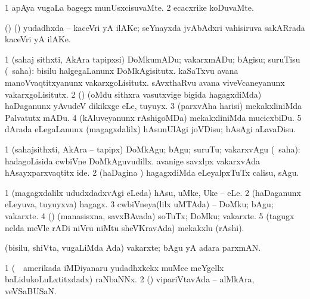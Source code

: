 {\bentry
{} 
\gl{\kirxvi}
\expl{}
\bmng
\bnum
\num{1} apAya \mo vugaLa bagegx munUsxcisuvaMte. 
\num{2} ecacxrike koDuvaMte. 
\enum
\emng
\eentry

\bentry
{} 
\gl{\nA}
\expl{}
\bmng
(\birx) (\ca) yudadhxda -- kaceVri yA ilAKe; seYnayxda jvAbAdxri vahisiruva sakARrada kaceVri yA ilAKe. 
\emng
\eentry

\bentry
{} 
\gl{\sakirx}
\expl{}
\bmng
\bnum
\num{1} (sahaj sithxti, AkAra tapipxsi) DoMkumADu; vakarxmADu; bAgisu; suruTisu (\rUpa\ saha):  bisilu halgegaLanunx DoMkAgisitutx.  kaSaTxvu avana manoVvaqtitxyanunx vakarxgoLisitutx.  sAvxthaRvu avana viveVcaneyanunx vakarxgoLisitutx. 
\num{2} (\nw) (oMdu sithxra vasutxvige bigida hagagxdiMda) haDaganunx yAvudeV dikikxge eLe, tuyuyx. 
\num{3} (parxvAha harisi) mekakxliniMda Palvatutx mADu. 
\num{4} (kAluveyanunx rAshigoMDa) mekakxliniMda mucicxbiDu. 
\num{5} dArada eLegaLanunx (magagxdalilx) hAsunUlAgi joVDisu; hAsAgi aLavaDisu. 
\enum
\emng

\noindent 
\gl{\akirx}
\expl{}
\bmng
\bnum
\num{1} (sahajsithxti, AkAra -- tapipx) DoMkAgu; bAgu; suruTu; vakarxvAgu (\rUpa\ saha):  hadagoLisida cwbiVne DoMkAguvudillx.  avanige savxlpx vakarxvAda hAsayxparxvaqtitx ide. 
\num{2} (haDagina \vi) hagagxdiMda eLeyalpxTuTx calisu, sAgu. 
\enum
\emng
\eentry

\bentry
{} 
\gl{\nA}
\expl{}
\bmng
\bnum
\num{1} (magagxdalilx ududxdadxvAgi eLeda) hAsu, uMke, Uke -- eLe. 
\num{2} (haDaganunx eLeyuva, tuyuyxva) hagagx. 
\num{3} cwbiVneya(lilx uMTAda) -- DoMku; bAgu; vakarxte. 
\num{4} (\rUpa) (manasisxna, savxBAvada) soTuTx; DoMku; vakarxte. 
\num{5} (tagugx nelda meVle rADi niVru niMtu sheVKravAda) mekakxlu (rAshi). 
\enum
\emng
\eentry

\bentry
{} 
\gl{\nA}
\expl{}
\bmng
(bisilu, shiVta, \mo vugaLiMda Ada) vakarxte; bAgu yA adara parxmAN. 
\emng
\eentry

\bentry
{} 
\gl{\nA}
\expl{}
\bmng
\bnum
\num{1} (\kanmu\ \kanu\ amerikada iMDiyanaru yudadhxkekx muMce meYgellx baLidukoLuLxtitxdadx) raNbaNNx. 
\num{2} (\AmA) vipariVtavAda -- alMkAra, veVSaBUSaN. 
\enum
\emng
\eentry

}
